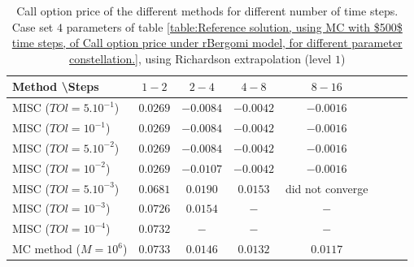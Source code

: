 \documentclass[11pt]{article}
\begin{document}
%









\begin{table}[h!]
\centering
\begin{tabular}{l*{6}{c}r}
Method \textbackslash  Steps    &$1-2$         & $2-4$ & $4-8$ & $8-16$\\
\hline
MISC ($TOl=5.10^{-1}$)& $0.0269$  & $-0.0084$ & $-0.0042$ & $-0.0016$ \\
MISC ($TOl=10^{-1}$)  &$0.0269$  &  $-0.0084$ &$-0.0042$ & $-0.0016$  \\
MISC ($TOl=5.10^{-2}$)  &$0.0269$  & $-0.0084$ & $-0.0042$ & $-0.0016$  \\
MISC ($TOl=10^{-2}$)  & $0.0269$  & $-0.0107$ &$-0.0042$ & $-0.0016$  \\
MISC ($TOl=5.10^{-3}$)  & $0.0681$ & $0.0190$ & $0.0153$ & did not converge \\
MISC ($TOl=10^{-3}$)  & $0.0726$ & $0.0154$ & $-$ & $-$ \\

MISC ($TOl=10^{-4}$)  & $0.0732$ & $-$ & $-$ & $-$  \\
\hline
MC method ($M=10^6$)  &$0.0733$ & $0.0146$ & $0.0132$ & $0.0117$ \\
\hline
\end{tabular}
\caption{Call option price of the different methods for different number of time steps. Case set $4$ parameters of table \ref{table:Reference solution, using MC with $500$ time steps, of Call option price under rBergomi model, for different parameter constellation.}, using Richardson extrapolation (level $1$)}
\label{table:  Call option price of the different methods for different number of time steps. Case set $4$ parameter, using Richardson extrapolation (level $1$),linear}
\end{table}
\end{document}
